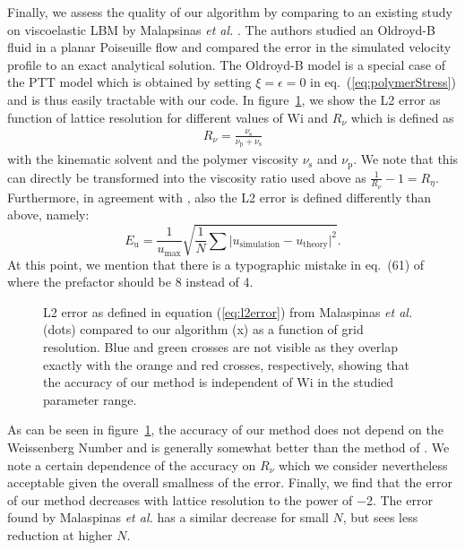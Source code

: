 \documentclass[a4paper,12pt]{scrartcl}
\newcommand{\abs}[1]{\lvert#1\rvert}
\begin{document}
Finally, we assess the quality of our algorithm by comparing to an existing study on viscoelastic LBM by Malapsinas \textit{et al.} \cite{malaspinas2010}.
The authors studied an Oldroyd-B fluid in a planar Poiseuille flow and compared the error in the simulated velocity profile to an exact analytical solution.
The Oldroyd-B model is a special case of the PTT model which is obtained by setting $\xi = \epsilon = 0$ in eq.~(\ref{eq:polymerStress}) and is thus easily tractable with our code.
In figure~\ref{fig:malaspinas2010}, we show the L2 error as function of lattice resolution for different values of $\mathrm{Wi}$ and $R_ \nu $ which is defined as \cite{malaspinas2010}
\begin{align}
	R_\nu = \frac{\nu_\text{s}}{\nu_\text{p}+\nu_\text{s}}
\end{align}
with the kinematic solvent and the polymer viscosity $\nu_\text{s}$ and $\nu_\text{p}$. 
We note that this can directly be transformed into the viscosity ratio used above as $\frac{1}{R_\nu}-1=R_\eta$.
Furthermore, in agreement with \cite{malaspinas2010}, also the L2 error is defined differently than above, namely:
	\begin{equation}\label{eq:l2error}
		E_\text{u} = \frac{1}{u_\text{max}}\sqrt{\frac{1}{N}\sum\abs{u_\text{simulation}-u_\text{theory}}^2}.
	\end{equation}
At this point, we mention that there is a typographic mistake in eq.~(61) of \cite{malaspinas2010} where the prefactor should be 8 instead of 4.

	\begin{figure}[H]
		\centering
		\caption{L2 error as defined in equation (\ref{eq:l2error}) from Malaspinas \textit{et al.}\cite{malaspinas2010} (dots) compared to our algorithm (x) as a function of grid resolution.
		Blue and green crosses are not visible as they overlap exactly with the orange and red crosses, respectively, showing that the accuracy of our method is independent of $\mathrm{Wi}$ in the studied parameter range.}
		\label{fig:malaspinas2010}
	\end{figure}

As can be seen in figure~\ref{fig:malaspinas2010}, the accuracy of our method does not depend on the Weissenberg Number and is generally somewhat better than the method of \cite{malaspinas2010}.
We note a certain dependence of the accuracy on $R_\nu$ which we consider nevertheless acceptable given the overall smallness of the error.
Finally, we find that the error of our method decreases with lattice resolution to the power of \num{-2}. The error found by Malaspinas \textit{et al.} has a similar decrease for small $N$, but sees less reduction at higher $N$.
\end{document}
